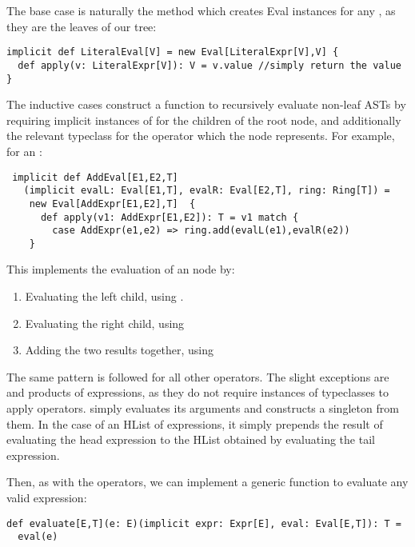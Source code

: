The base case is naturally the method which creates Eval instances for any , as they are the leaves of our tree:
\vs\begin{lstlisting}
implicit def LiteralEval[V] = new Eval[LiteralExpr[V],V] {
  def apply(v: LiteralExpr[V]): V = v.value //simply return the value
}
\end{lstlisting}\vs
The inductive cases construct a function to recursively evaluate non-leaf ASTs by requiring implicit instances of  for the children of the root node, and additionally the relevant typeclass for the operator which the node represents. For example, for an :
\vs\begin{lstlisting}
 implicit def AddEval[E1,E2,T]
   (implicit evalL: Eval[E1,T], evalR: Eval[E2,T], ring: Ring[T]) =
    new Eval[AddExpr[E1,E2],T]  {
      def apply(v1: AddExpr[E1,E2]): T = v1 match {
        case AddExpr(e1,e2) => ring.add(evalL(e1),evalR(e2))
    }
\end{lstlisting}\vs
This implements the evaluation of an  node by:
\begin{enumerate}
\item{Evaluating the left child, using }.
\item{Evaluating the right child, using }
\item{Adding the two results together, using }
\end{enumerate}
The same pattern is followed for all other operators. The slight exceptions are  and products of expressions, as they do not require instances of typeclasses to apply operators.  simply evaluates its arguments and constructs a singleton  from them. In the case of an HList of expressions, it simply prepends the result of evaluating the head expression to the HList obtained by evaluating the tail expression.

Then, as with the operators, we can implement a generic function to evaluate any valid expression:
\vs\begin{lstlisting}
def evaluate[E,T](e: E)(implicit expr: Expr[E], eval: Eval[E,T]): T =
  eval(e)
\end{lstlisting}\vs

